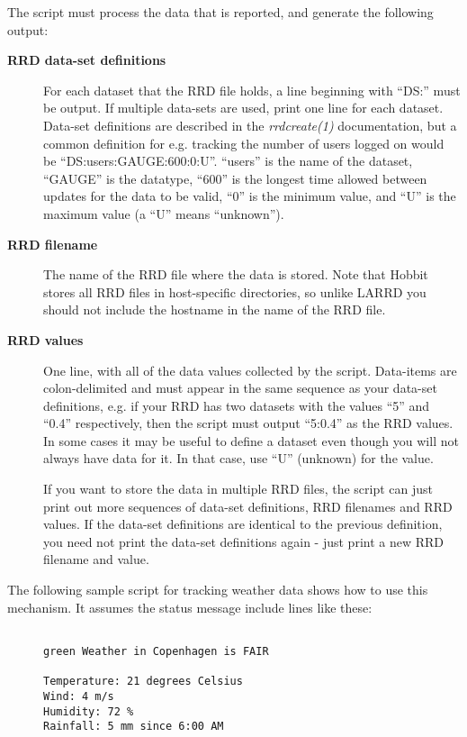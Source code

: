   The script must process the data that is reported, and generate the following output: 


 \begin{description}
\item[\textbf{RRD data-set definitions}
] For each dataset that the RRD file holds, a line beginning with ``DS:'' must be output. If multiple data-sets are used, print one line for each dataset.  
 Data-set definitions are described in the \emph{rrdcreate(1)}
 documentation, but a common definition for e.g. tracking the number of users logged on would be ``DS:users:GAUGE:600:0:U''. ``users'' is the name of the dataset, ``GAUGE'' is the datatype, ``600'' is the longest time allowed between updates for the data to be valid, ``0'' is the minimum value, and ``U'' is the maximum value (a ``U'' means ``unknown''). 
\item[\textbf{RRD filename}
] The name of the RRD file where the data is stored. Note that Hobbit stores all RRD files in host-specific directories, so unlike LARRD you should not include the hostname in the name of the RRD file. 
\item[\textbf{RRD values}
] One line, with all of the data values collected by the script. Data-items are colon-delimited and must appear in the same sequence as your data-set definitions, e.g. if your RRD has two datasets with the values ``5'' and ``0.4'' respectively, then the script must output ``5:0.4'' as the RRD values.  
 In some cases it may be useful to define a dataset even though you will not always have data for it. In that case, use ``U'' (unknown) for the value. 

  If you want to store the data in multiple RRD files, the script can just print out more sequences of data-set definitions, RRD filenames and RRD values. If the data-set definitions are identical to the previous definition, you need not print the data-set definitions again - just print a new RRD filename and value. 


 


\end{description}



  The following sample script for tracking weather data shows how to use this mechanism. It assumes the status message include lines like these: \begin{description}
\item[]\begin{verbatim}

green Weather in Copenhagen is FAIR

Temperature: 21 degrees Celsius
Wind: 4 m/s
Humidity: 72 %
Rainfall: 5 mm since 6:00 AM

\end{verbatim}


\end{description}



